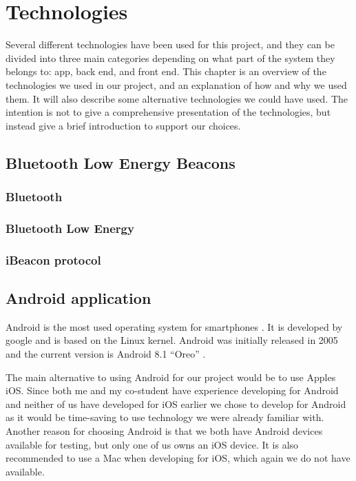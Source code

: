 \documentclass[../Main/thesis.tex]{subfiles}
\begin{document}
\chapter{Technologies}
\label{ch:technologies}

Several different technologies have been used for this project, and they can be divided into three main categories depending on what part of the system they belongs to: app, back end, and front end.
This chapter is an overview of the technologies we used in our project, and an explanation of how and why we used them.
It will also describe some alternative technologies we could have used.
The intention is not to give a comprehensive presentation of the technologies, but instead give a brief introduction to support our choices.

\section{Bluetooth Low Energy Beacons}

\subsection{Bluetooth}

\subsection{Bluetooth Low Energy}

\subsection{iBeacon protocol}

\section{Android application}
Android is the most used operating system for smartphones \citep{osmarketshare}. 
It is developed by google and is based on the Linux kernel.
Android was initially released in 2005 \citep{Morrill2008a} and the current version is Android 8.1 ``Oreo'' \citep{Burke2017a}.

The main alternative to using Android for our project would be to use Apples iOS.
Since both me and my co-student have experience developing for Android and neither of us have developed for iOS earlier we chose to develop for Android as it would be time-saving to use technology we were already familiar with.
Another reason for choosing Android is that we both have Android devices available for testing, but only one of us owns an iOS device.
It is also recommended to use a Mac when developing for iOS, which again we do not have available.
\end{document}
